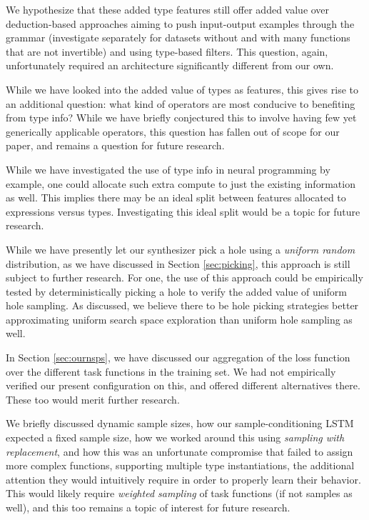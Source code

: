 \documentclass{article}
\begin{document}
    We hypothesize that these added type features still offer added value over
    deduction-based approaches aiming to push input-output examples through the grammar
    (investigate separately for datasets without and with many functions that are not invertible)
    and using type-based filters.
    This question, again, unfortunately required an architecture significantly different from our own.

    While we have looked into the added value of types as features,
    this gives rise to an additional question:
    what kind of operators are most conducive to benefiting from type info?
    While we have briefly conjectured this to involve having few yet generically applicable operators,
    this question has fallen out of scope for our paper,
    and remains a question for future research.

    While we have investigated the use of type info in neural programming by example,
    one could allocate such extra compute to just the existing information as well.
    This implies there may be an ideal split between features allocated to expressions versus types.
    Investigating this ideal split would be a topic for future research.

    While we have presently let our synthesizer pick a hole using a \emph{uniform random} distribution,
    as we have discussed in Section \ref{sec:picking},
    this approach is still subject to further research.
    For one, the use of this approach could be empirically tested by deterministically picking a hole to verify the added value of uniform hole sampling.
    As discussed, we believe there to be hole picking strategies better approximating uniform search space exploration than uniform hole sampling as well.

    In Section \ref{sec:ournsps}, we have discussed our aggregation of
    the loss function over the different task functions in the training set.
    We had not empirically verified our present configuration on this,
    and offered different alternatives there.
    These too would merit further research.

    We briefly discussed dynamic sample sizes,
    how our sample-conditioning LSTM expected a fixed sample size,
    how we worked around this using \emph{sampling with replacement},
    and how this was an unfortunate compromise that failed to assign more complex functions,
    supporting multiple type instantiations,
    the additional attention they would intuitively require in order to properly learn their behavior.
    This would likely require \emph{weighted sampling} of task functions (if not samples as well),
    and this too remains a topic of interest for future research.
\end{document}
